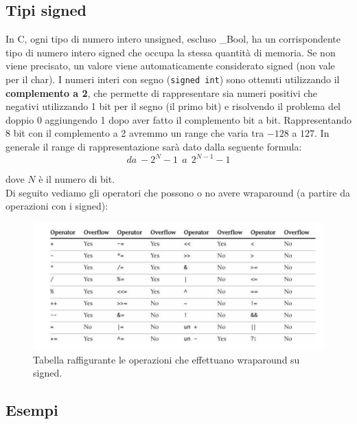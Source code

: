 \subsection{Tipi signed}

In C, ogni tipo di numero intero unsigned, escluso \_Bool, ha un corrispondente
tipo di numero intero signed che occupa la stessa quantità di memoria.
Se non viene precisato, un valore viene automaticamente considerato signed
(non vale per il char).
I numeri interi con segno (\verb|signed int|) sono ottenuti utilizzando il \textbf{complemento a 2},
che permette di rappresentare sia numeri positivi
che negativi utilizzando 1 bit per il segno (il primo bit) e risolvendo il problema del doppio 0 aggiungendo
1 dopo aver fatto il complemento bit a bit.
Rappresentando 8 bit con il complemento a 2 avremmo un range che varia tra $-128$ a $127$.
In generale il range di rappresentazione sarà dato dalla seguente formula:
\[
    da \ -2^{N} - 1 \ \ a \ \ 2^{N - 1} - 1
\]

dove $N$ è il numero di bit.\\
Di seguito vediamo gli operatori che possono o no avere wraparound (a partire da
operazioni con i signed):

\begin{figure}[H]
    \centering
    \includegraphics[width=12cm, keepaspectratio]{capitoli/secure_coding/img/cap_2/wraparound_signed.png}
    \caption{Tabella raffigurante le operazioni che effettuano wraparound su signed.}
\end{figure}

\subsection{Esempi}

